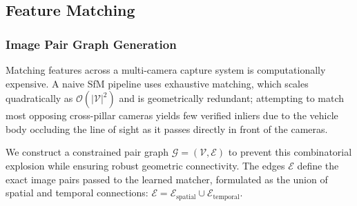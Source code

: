 \documentclass[letterpaper, 10 pt, conference]{ieeeconf}  %
\begin{document}


\subsection{Feature Matching}

\label{subsec:methodology_feature_matching}










\subsubsection{Image Pair Graph Generation}


Matching features across a multi-camera capture system is computationally expensive. A naive SfM pipeline uses exhaustive matching, which scales quadratically as $\mathcal{O}(|\mathcal{V}|^2)$ and is geometrically redundant; attempting to match most opposing cross-pillar cameras yields few verified inliers due to the vehicle body occluding the line of sight as it passes directly in front of the cameras.

We construct a constrained pair graph $\mathcal{G} = (\mathcal{V}, \mathcal{E})$ to prevent this combinatorial explosion while ensuring robust geometric connectivity. The edges $\mathcal{E}$ define the exact image pairs passed to the learned matcher, formulated as the union of spatial and temporal connections:
$
    \mathcal{E} = \mathcal{E}_{\text{spatial}} \cup \mathcal{E}_{\text{temporal}}.
$
\end{document}
